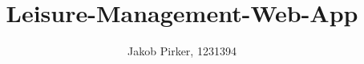 \documentclass[]{scrartcl}
\title{Leisure-Management-Web-App}
\author{Jakob Pirker, 1231394}
\begin{document}
\maketitle

\newpage
\tableofcontents 

\newpage

\FloatBarrier

\newpage
\FloatBarrier

\newpage
\FloatBarrier

\newpage
\FloatBarrier

\newpage
\FloatBarrier

\end{document}
